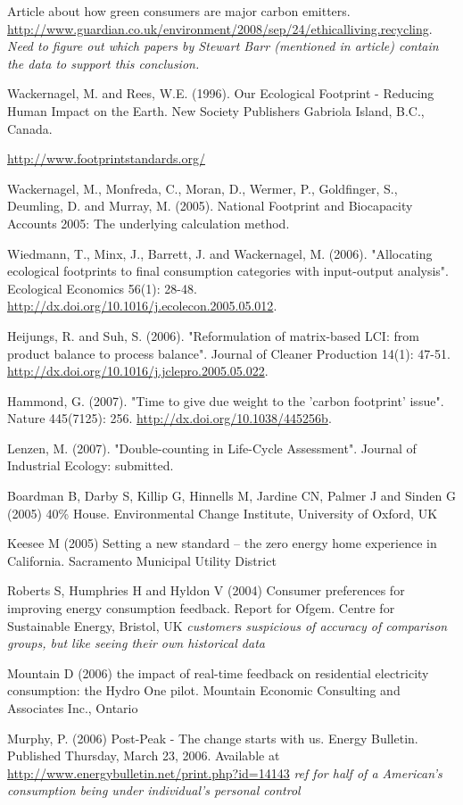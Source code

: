 Article about how green consumers are major carbon emitters. \url{http://www.guardian.co.uk/environment/2008/sep/24/ethicalliving.recycling}. \emph{Need to figure out which papers by Stewart Barr (mentioned in article) contain the data to support this conclusion.}

Wackernagel, M. and Rees, W.E. (1996). Our Ecological Footprint - Reducing Human Impact on the Earth. New Society Publishers Gabriola Island, B.C., Canada.

\url{http://www.footprintstandards.org/}

Wackernagel, M., Monfreda, C., Moran, D., Wermer, P., Goldfinger, S., Deumling, D. and Murray, M. (2005). National Footprint and Biocapacity Accounts 2005: The underlying calculation method.

Wiedmann, T., Minx, J., Barrett, J. and Wackernagel, M. (2006). "Allocating ecological footprints to final consumption categories with input-output analysis". Ecological Economics 56(1): 28-48. \url{http://dx.doi.org/10.1016/j.ecolecon.2005.05.012}.

Heijungs, R. and Suh, S. (2006). "Reformulation of matrix-based LCI: from product balance to process balance". Journal of Cleaner Production 14(1): 47-51. 
\url{http://dx.doi.org/10.1016/j.jclepro.2005.05.022}.

Hammond, G. (2007). "Time to give due weight to the 'carbon footprint' issue". Nature 445(7125): 256. \url{http://dx.doi.org/10.1038/445256b}.

Lenzen, M. (2007). "Double-counting in Life-Cycle Assessment". Journal of Industrial Ecology: submitted.

Boardman B, Darby S, Killip G, Hinnells M, Jardine CN, Palmer J and Sinden G (2005) 40\% House. Environmental Change Institute, University of Oxford, UK

Keesee M (2005) Setting a new standard – the zero energy home experience in California. Sacramento Municipal Utility District

Roberts S, Humphries H and Hyldon V (2004) Consumer preferences for improving energy consumption feedback. Report for Ofgem. Centre for Sustainable Energy, Bristol, UK \emph{customers suspicious of accuracy of comparison groups, but like seeing their own historical data}

Mountain D (2006) the impact of real-time feedback on residential electricity consumption: the Hydro One pilot. Mountain Economic Consulting and Associates Inc., Ontario

Murphy, P. (2006) Post-Peak - The change starts with us. Energy Bulletin. Published Thursday, March 23, 2006. Available at \url{http://www.energybulletin.net/print.php?id=14143} \emph{ref for half of a American's consumption being under individual's personal control}

